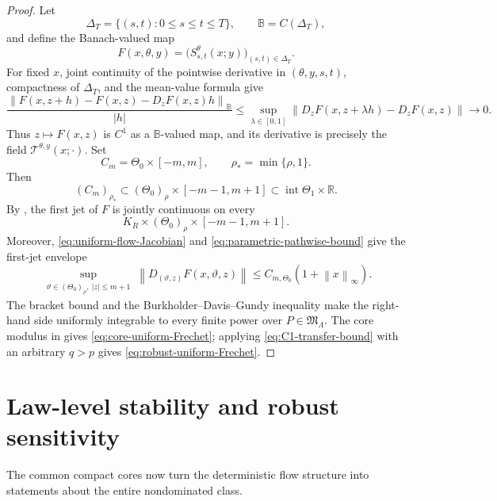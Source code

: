 \documentclass[11pt,reqno]{amsart}
\theoremstyle{plain}
\theoremstyle{definition}
\newcommand{\R}{\mathbb R}
\newcommand{\norm}[1]{\left\lVert #1\right\rVert}
\begin{document}
\begin{proof}
Let
\[
  \Delta_T=\{(s,t):0\le s\le t\le T\},
  \qquad \mathbb B=C(\Delta_T),
\]
and define the Banach-valued map
\[
  F(x,\theta,y)=\bigl(S_{s,t}^\theta(x;y)\bigr)_{(s,t)\in\Delta_T}.
\]
For fixed \(x\), joint continuity of the pointwise derivative in
\((\theta,y,s,t)\), compactness of \(\Delta_T\), and the mean-value formula
give
\[
  \frac{\norm{F(x,z+h)-F(x,z)-D_zF(x,z)h}_{\mathbb B}}{|h|}
  \le
  \sup_{\lambda\in[0,1]}
  \norm{D_zF(x,z+\lambda h)-D_zF(x,z)}
  \longrightarrow0.
\]
Thus \(z\mapsto F(x,z)\) is \(C^1\) as a \(\mathbb B\)-valued map, and
its derivative is precisely the field
\(\mathcal T^{\theta,y}(x;\cdot)\).  Set
\[
  C_m=\Theta_0\times[-m,m],
  \qquad \rho_*=\min\{\rho,1\}.
\]
Then
\[
  (C_m)_{\rho_*}
  \subset(\Theta_0)_\rho\times[-m-1,m+1]
  \subset\operatorname{int}\Theta_1\times\R.
\]
By
, the first jet of \(F\) is
jointly continuous on every
\[
  K_R\times(\Theta_0)_\rho\times[-m-1,m+1].
\]
Moreover, \eqref{eq:uniform-flow-Jacobian} and
\eqref{eq:parametric-pathwise-bound} give the first-jet envelope
\begin{equation}\label{eq:joint-first-jet-envelope}
  \sup_{\substack{\vartheta\in(\Theta_0)_\rho,\ |z|\le m+1}}
  \norm{D_{(\vartheta,z)}F(x,\vartheta,z)}
  \le C_{m,\Theta_0}(1+\norm{x}_\infty).
\end{equation}
The bracket bound and the Burkholder--Davis--Gundy inequality make the
right-hand side uniformly integrable to every finite power over
\(P\in\mathfrak M_\Lambda\).  The core modulus in
 gives
\eqref{eq:core-uniform-Frechet}; applying
\eqref{eq:C1-transfer-bound} with an arbitrary \(q>p\) gives
\eqref{eq:robust-uniform-Frechet}.
\end{proof}

\section{Law-level stability and robust sensitivity}
\label{sec:probability-output}

The common compact cores now turn the deterministic flow structure into
statements about the entire nondominated class.
\end{document}
